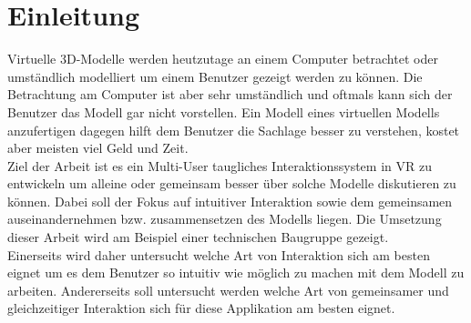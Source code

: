 \chapter{Einleitung}
\label{ch:Einleitung}

Virtuelle 3D-Modelle werden heutzutage an einem Computer betrachtet oder umständlich modelliert um einem Benutzer gezeigt werden zu können. Die Betrachtung am Computer ist aber sehr umständlich und oftmals kann sich der Benutzer das Modell gar nicht vorstellen. Ein Modell eines virtuellen Modells anzufertigen dagegen hilft dem Benutzer die Sachlage besser zu verstehen, kostet aber meisten viel Geld und Zeit. \\

\noindent Ziel der Arbeit ist es ein Multi-User taugliches Interaktionssystem in VR zu entwickeln um alleine oder gemeinsam besser über solche Modelle diskutieren zu können. Dabei soll der Fokus auf intuitiver Interaktion sowie dem gemeinsamen auseinandernehmen bzw. zusammensetzen des Modells liegen. Die Umsetzung dieser Arbeit wird am Beispiel einer technischen Baugruppe gezeigt. \\

\noindent Einerseits wird daher untersucht welche Art von Interaktion sich am besten eignet um es dem Benutzer so intuitiv wie möglich zu machen mit dem Modell zu arbeiten. Andererseits soll untersucht werden welche Art von gemeinsamer und gleichzeitiger Interaktion sich für diese Applikation am besten eignet.